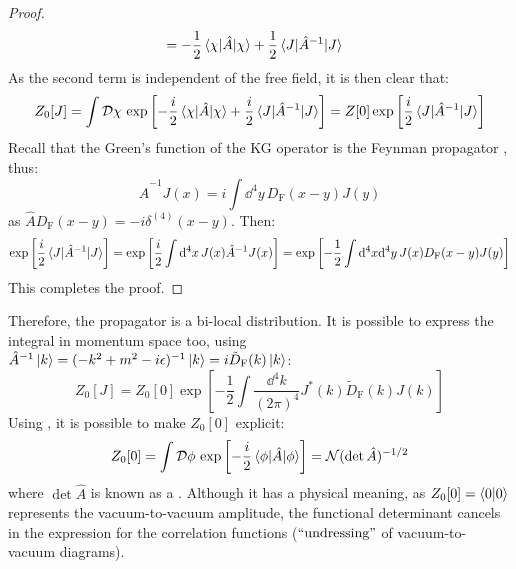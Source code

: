\begin{proofbox}
\begin{proof}
\begin{equation*}
\begin{split}
        & = - \frac{1}{2} \braket{\chi | \hat{A} | \chi} + \frac{1}{2} \braket{J | \hat{A}^{-1} | J}
      \end{split}
    \end{equation*}
    As the second term is independent of the free field, it is then clear that:
    \begin{equation*}
      Z_0[J] = \int \mathcal{D}\chi\, \exp \left[ - \frac{i}{2} \braket{\chi | \hat{A} | \chi} + \frac{i}{2} \braket{J | \hat{A}^{-1} | J} \right] = Z[0] \exp \left[ \frac{i}{2} \braket{J | \hat{A}^{-1} | J} \right]
    \end{equation*}
    Recall that the Green's function of the KG operator is the Feynman propagator , thus:
    \begin{equation*}
      \hat{A}^{-1} J(x) = i \int \dd^4y\, D_\text{F}(x - y) J(y)
    \end{equation*}
    as $ \hat{A} D_\text{F}(x-y) = -i \delta^{(4)}(x-y) $. Then:
    \begin{equation*}
      \exp \left[ \frac{i}{2} \braket{J | \hat{A}^{-1} | J} \right] = \exp \left[ \frac{i}{2} \int \mathrm{d}^4x\, J(x) \hat{A}^{-1} J(x) \right] = \exp \left[ -\frac{1}{2} \int \mathrm{d}^4x \mathrm{d}^4y\, J(x) D_\text{F}(x-y) J(y) \right]
    \end{equation*}
    This completes the proof.
  \end{proof}
\end{proofbox}

Therefore, the propagator is a bi-local distribution. It is possible to express the integral in momentum space too, using $ \hat{A}^{-1} \ket{k} = (-k^2 + m^2 -i\epsilon)^{-1} \ket{k} = i \tilde{D}_\text{F}(k) \ket{k} $:
\begin{equation}
  Z_0[J] = Z_0[0] \exp \left[ - \frac{1}{2} \int \frac{\dd^4k}{(2\pi)^4} J^*(k) \tilde{D}_\text{F}(k) J(k) \right]
\end{equation}
Using , it is possible to make $ Z_0[0] $ explicit:
\begin{equation}
  Z_0[0] = \int \mathcal{D}\phi\, \exp \left[ - \frac{i}{2} \braket{\phi | \hat{A} | \phi} \right] = \mathcal{N} (\det \hat{A})^{-1/2}
\end{equation}
where $ \det\hat{A} $ is known as a . Although it has a physical meaning, as $ Z_0[0] = \braket{0 | 0} $ represents the vacuum-to-vacuum amplitude, the functional determinant cancels in the expression for the correlation functions ($ ``\text{undressing}" $ of vacuum-to-vacuum diagrams).

